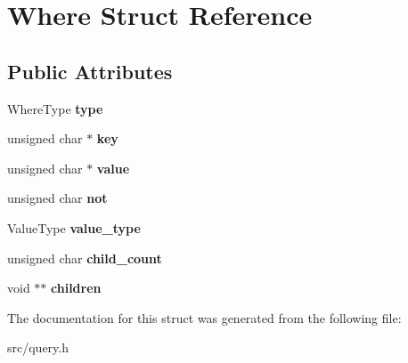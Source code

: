 \hypertarget{struct_where}{}\section{Where Struct Reference}
\label{struct_where}
\subsection*{Public Attributes}
\begin{DoxyCompactItemize}
\item 
\hypertarget{struct_where_aaed6b2878aee96fe201fb2f742263ffc}{}Where\+Type {\bfseries type}\label{struct_where_aaed6b2878aee96fe201fb2f742263ffc}

\item 
\hypertarget{struct_where_acc56730a928e427386a12d774daed6f4}{}unsigned char $\ast$ {\bfseries key}\label{struct_where_acc56730a928e427386a12d774daed6f4}

\item 
\hypertarget{struct_where_a0cde10d3f5c5539ce110c8db2c22a0aa}{}unsigned char $\ast$ {\bfseries value}\label{struct_where_a0cde10d3f5c5539ce110c8db2c22a0aa}

\item 
\hypertarget{struct_where_af875188cf4d8323816057033f7ef4c89}{}unsigned char {\bfseries not}\label{struct_where_af875188cf4d8323816057033f7ef4c89}

\item 
\hypertarget{struct_where_a10bb3d6cdf41f7844b6f93a7f794e48a}{}Value\+Type {\bfseries value\+\_\+type}\label{struct_where_a10bb3d6cdf41f7844b6f93a7f794e48a}

\item 
\hypertarget{struct_where_adcde741e6892e6f5cbde454c204771b0}{}unsigned char {\bfseries child\+\_\+count}\label{struct_where_adcde741e6892e6f5cbde454c204771b0}

\item 
\hypertarget{struct_where_a703bc718d62931c8bf2edf1bc6924c61}{}void $\ast$$\ast$ {\bfseries children}\label{struct_where_a703bc718d62931c8bf2edf1bc6924c61}

\end{DoxyCompactItemize}


The documentation for this struct was generated from the following file\+:\begin{DoxyCompactItemize}
\item 
src/query.\+h\end{DoxyCompactItemize}

